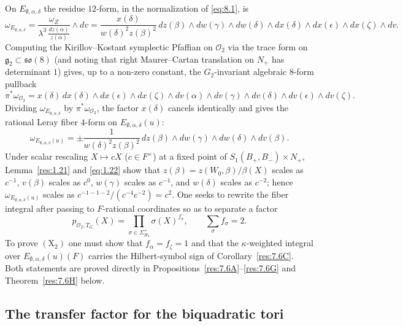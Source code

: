 \documentclass[12pt,letterpaper]{amsart}
\theoremstyle{plain}
\theoremstyle{definition}
\theoremstyle{remark}
\theoremstyle{definition}
\begin{document}
On $E_{\emptyset,\alpha,\delta}$ the residue $12$-form, in the normalization of
\eqref{eq:8.1}, is
\[
\omega_{E_{\emptyset,\alpha,\delta}}=\frac{\omega_Z}{\lambda^3\,
\frac{dz(\alpha)}{z(\alpha)}}
\wedge dv
=\frac{x(\delta)}{w(\delta)^2z(\beta)^2}\,dz(\beta)\wedge dw(\gamma)\wedge
dw(\delta)\wedge dx(\delta)\wedge dx(\epsilon)\wedge dx(\zeta)\wedge dv.
\]
Computing the Kirillov--Kostant symplectic Pfaffian on ${\mathcal O}_2$ via the
trace form on $\mathfrak g_2\subset\mathfrak{so}(8)$ (and noting that right
Maurer--Cartan translation on $N_+$ has determinant $1$) gives, up to a
non-zero constant, the $G_2$-invariant algebraic $8$-form pullback
\begin{equation}\tag{7.3}\label{eq:7.3}
\pi^*\omega_{{\mathcal O}_2}
=x(\delta)\,dx(\delta)\wedge dx(\epsilon)\wedge dx(\zeta)\wedge
dv(\alpha)\wedge dv(\gamma)\wedge dv(\delta)\wedge dv(\epsilon)\wedge dv(\zeta).
\end{equation}
Dividing $\omega_{E_{\emptyset,\alpha,\delta}}$ by $\pi^*\omega_{{\mathcal O}_2}$,
the factor $x(\delta)$ cancels identically and gives the rational Leray fiber
$4$-form on $E_{\emptyset,\alpha,\delta}(u)$:
\begin{equation}\tag{7.4}\label{eq:7.4}
\omega_{E_{\emptyset,\alpha,\delta}(u)}=
\pm\frac{1}{w(\delta)^2z(\beta)^2}\,
dz(\beta)\wedge dw(\gamma)\wedge dw(\delta)\wedge dv(\beta).
\end{equation}
Under scalar rescaling $X\mapsto cX$ ($c\in F^\times$) at a fixed point of
$S_1(B_+,B_-)\times N_+$, Lemma~\ref{res:1.21} and \eqref{eq:1.22} show that
$z(\beta)=z(W_0,\beta)/\beta(X)$ scales as $c^{-1}$, $v(\beta)$ scales as $c^0$,
$w(\gamma)$ scales as $c^{-1}$, and $w(\delta)$ scales as $c^{-2}$; hence
$\omega_{E_{\emptyset,\alpha,\delta}(u)}$ scales as
$c^{-1-1-2}/(c^{-4}c^{-2})=c^2$. One seeks to rewrite the fiber integral after
passing to $F$-rational coordinates so as to separate a factor
\begin{equation}\tag{7.5}\label{eq:7.5}
p_{{\mathcal O}_2,T_G}(X)=\prod_{\sigma \in \Sigma_{H_2}^+}\sigma(X)^{f_\sigma},
\qquad \sum_{\sigma}f_\sigma =2 .
\end{equation}
To prove $(\mathrm X_2)$ one must show that $f_\alpha=f_\zeta=1$ and that the
$\kappa$-weighted integral over $E_{\emptyset,\alpha,\delta}(u)(F)$ carries the
Hilbert-symbol sign of Corollary~\ref{res:7.6C}. Both statements are proved
directly in Propositions~\ref{res:7.6A}--\ref{res:7.6G} and
Theorem~\ref{res:7.6H} below.

\subsection*{The transfer factor for the biquadratic tori}
\end{document}
